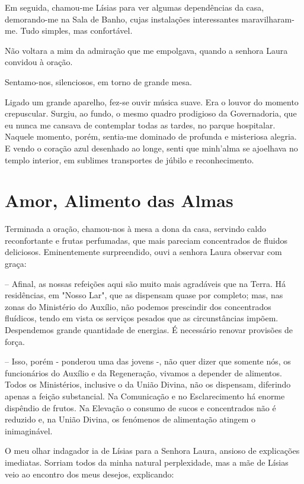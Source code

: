 \documentclass[portuguese,12pt,a4paper]{scrbook}
\begin{document}
	Em seguida, chamou-me Lísias para ver algumas dependências da casa, demorando-me na Sala de Banho, cujas instalações interessantes maravilharam-me. Tudo simples, mas confortável.
	
	Não voltara a mim da admiração que me empolgava, quando a senhora Laura convidou à oração.
	
	Sentamo-nos, silenciosos, em torno de grande mesa.
	
	Ligado um grande aparelho, fez-se ouvir música suave. Era o louvor do momento crepuscular. Surgiu, ao fundo, o mesmo quadro prodigioso da Governadoria, que eu nunca me cansava de contemplar todas as tardes, no parque hospitalar. Naquele momento, porém, sentia-me dominado de profunda e misteriosa alegria. E vendo o coração azul desenhado ao longe, senti que minh’alma se ajoelhava no templo interior, em sublimes transportes de júbilo e reconhecimento.
	
	
	\chapter{Amor, Alimento das Almas}
	
	Terminada a oração, chamou-nos à mesa a dona da casa, servindo caldo reconfortante e frutas perfumadas, que mais pareciam concentrados de fluidos deliciosos. Eminentemente surpreendido, ouvi a senhora Laura observar com graça:
	
	– Afinal, as nossas refeições aqui são muito mais agradáveis que na Terra. Há residências, em "Nosso Lar", que as dispensam quase por completo; mas, nas zonas do Ministério do Auxílio, não podemos prescindir dos concentrados fluídicos, tendo em vista os serviços pesados que as circunstâncias impõem. Despendemos grande quantidade de energias. É necessário renovar provisões de força.
	
	– Isso, porém - ponderou uma das jovens -, não quer dizer que somente nós, os funcionários do Auxílio e da Regeneração, vivamos a depender de alimentos. Todos os Ministérios, inclusive o da União Divina, não os dispensam, diferindo apenas a feição substancial. Na Comunicação e no Esclarecimento há enorme dispêndio de frutos. Na Elevação o consumo de sucos e concentrados não é reduzido e, na União Divina, os fenómenos de alimentação atingem o inimaginável.
	
	O meu olhar indagador ia de Lísias para a Senhora Laura, ansioso de explicações imediatas. Sorriam todos da minha natural perplexidade, mas a mãe de Lísias veio ao encontro dos meus desejos, explicando:
	
\end{document}
